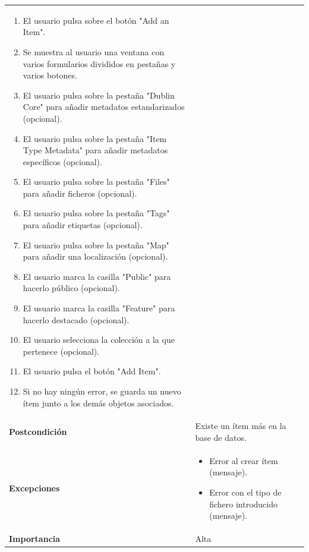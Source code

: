 \documentclass[
]{article}
\providecommand{\tightlist}{%
  \setlength{\itemsep}{0pt}\setlength{\parskip}{0pt}}
\begin{document}
\begin{longtable}[]{@{}ll@{}}
\begin{minipage}[t]{0.79\columnwidth}
\begin{enumerate}
\tightlist
\item
  El usuario pulsa sobre el botón "Add an Item".
\item
  Se muestra al usuario una ventana con varios formularios divididos en
  pestañas y varios botones.
\item
  El usuario pulsa sobre la pestaña "Dublin Core" para añadir metadatos
  estandarizados (opcional).
\item
  El usuario pulsa sobre la pestaña "Item Type Metadata" para añadir
  metadatos específicos (opcional).
\item
  El usuario pulsa sobre la pestaña "Files" para añadir ficheros
  (opcional).
\item
  El usuario pulsa sobre la pestaña "Tags" para añadir etiquetas
  (opcional).
\item
  El usuario pulsa sobre la pestaña "Map" para añadir una localización
  (opcional).
\item
  El usuario marca la casilla "Public" para hacerlo público (opcional).
\item
  El usuario marca la casilla "Feature" para hacerlo destacado
  (opcional).
\item
  El usuario selecciona la colección a la que pertenece (opcional).
\item
  El usuario pulsa el botón "Add Item".
\item
  Si no hay ningún error, se guarda un nuevo ítem junto a los demás
  objetos asociados.
\end{enumerate}\strut
\end{minipage}\tabularnewline
\begin{minipage}[t]{0.15\columnwidth}\raggedright
\textbf{Postcondición}\strut
\end{minipage} & \begin{minipage}[t]{0.79\columnwidth}\raggedright
Existe un ítem más en la base de datos.\strut
\end{minipage}\tabularnewline
\begin{minipage}[t]{0.15\columnwidth}\raggedright
\textbf{Excepciones}\strut
\end{minipage} & \begin{minipage}[t]{0.79\columnwidth}\raggedright
\begin{itemize}
\tightlist
\item
  Error al crear ítem (mensaje).
\item
  Error con el tipo de fichero introducido (mensaje).
\end{itemize}\strut
\end{minipage}\tabularnewline
\begin{minipage}[t]{0.15\columnwidth}\raggedright
\textbf{Importancia}\strut
\end{minipage} & \begin{minipage}[t]{0.79\columnwidth}\raggedright
Alta\strut
\end{minipage}\tabularnewline
\bottomrule
\end{longtable}
\end{document}
